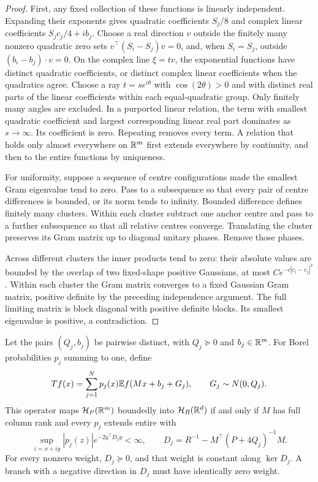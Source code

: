 \begin{proof}
First, any fixed collection of these functions is linearly
independent. Expanding their exponents gives quadratic
coefficients $S_j/8$ and complex linear coefficients
$S_jc_j/4+ib_j$. Choose a real direction $v$ outside the
finitely many nonzero quadratic zero sets
$v^\top(S_i-S_j)v=0$, and, when $S_i=S_j$, outside
$(b_i-b_j)\cdot v=0$. On the complex line $\xi=tv$,
the exponential functions have distinct quadratic coefficients,
or distinct complex linear coefficients when the quadratics agree.
Choose a ray $t=s e^{i\theta}$ with $\cos(2\theta)>0$ and
with distinct real parts of the linear coefficients within
each equal-quadratic group. Only finitely many angles are
excluded. In a purported linear relation, the term with
smallest quadratic coefficient and largest corresponding
linear real part dominates as $s\to\infty$. Its coefficient
is zero. Repeating removes every term. A relation that holds
only almost everywhere on $\mathbb R^m$ first extends everywhere
by continuity, and then to the entire functions by uniqueness.

For uniformity, suppose a sequence of centre configurations
made the smallest Gram eigenvalue tend to zero. Pass to a
subsequence so that every pair of centre differences is
bounded, or its norm tends to infinity. Bounded difference
defines finitely many clusters. Within each cluster subtract
one anchor centre and pass to a further subsequence so that
all relative centres converge. Translating the cluster
preserves its Gram matrix up to diagonal unitary phases.
Remove those phases.

Across different clusters the inner products tend to zero:
their absolute values are bounded by the overlap of two
fixed-shape positive Gaussians, at most
$C e^{-c|c_i-c_j|^2}$. Within each cluster the Gram matrix
converges to a fixed Gaussian Gram matrix, positive definite
by the preceding independence argument. The full limiting
matrix is block diagonal with positive definite blocks.
Its smallest eigenvalue is positive, a contradiction.
\end{proof}

\begin{theorem}\label{thm:unequal}
Let the pairs $(Q_j,b_j)$ be pairwise distinct, with
$Q_j\succeq0$ and $b_j\in\mathbb R^m$. For Borel probabilities
$p_j$ summing to one, define
\[
 Tf(x)=\sum_{j=1}^N p_j(x)\mathbb E f(Mx+b_j+G_j),
 \qquad G_j\sim N(0,Q_j).
\]
This operator maps $\mathcal H_P(\mathbb R^m)$ boundedly into $\mathcal H_R(\mathbb R^d)$
if and only if $M$ has full column rank and every $p_j$
extends entire with
\begin{equation}\label{eq:unequalcriterion}
 \sup_{z=x+iy}|p_j(z)|e^{-2y^\top D_jy}<\infty,\qquad
 D_j=R^{-1}-M^\top(P+4Q_j)^{-1}M.
\end{equation}
For every nonzero weight, $D_j\succeq0$, and that weight is
constant along $\ker D_j$. A branch with a negative direction
in $D_j$ must have identically zero weight.
\end{theorem}

